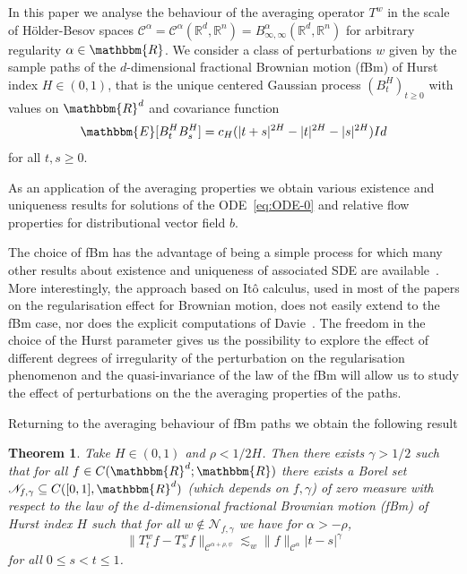 \documentclass[a4paper,11pt]{article}
\newtheorem{theorem}{Theorem}[section]
\newcommand{\CC}{\mathscr C}
\newcommand{\CN}{\mathscr N}
\newcommand{\RR}{\mathbb R}
\begin{document}
In this paper we analyse the behaviour of the averaging operator $T^{w}$ in
the scale of Hölder-Besov spaces $\CC^{\alpha} = \CC^{\alpha} ( \RR^{d} ,
\RR^{n} ) =B^{\alpha}_{\infty , \infty} ( \RR^{d} , \RR^{n} )$ for arbitrary
regularity $\alpha \in \mathbbm{R}$. We consider a class of perturbations $w$
given by the sample paths of the $d$-dimensional fractional Brownian motion
(fBm) of Hurst index $H \in ( 0,1 )$, that is the unique centered Gaussian
process $( B^{H}_{t} )_{t \geqslant 0}$ with values on $\mathbbm{R}^{d}$ and
covariance function
\[ \mathbbm{E} [ B^{H}_{t} B_{s}^{H} ] =c_{H} ( | t+s |^{2H} - | t |^{2H} - |
   s |^{2H} )Id \]
for all $t,s \geqslant 0$.

As an application of the averaging properties we obtain various existence and
uniqueness results for solutions of the ODE~{\eqref{eq:ODE-0}} and relative
flow properties for distributional vector field $b$.



The choice of fBm has the advantage of being a simple process for which many
other results about existence and uniqueness of associated SDE are
available~{\cite{MR1934157}}. More interestingly, the approach based on Itô
calculus, used in most of the papers on the regularisation effect for Brownian
motion, does not easily extend to the fBm case, nor does the explicit computations
of Davie~{\cite{MR2377011}}. The freedom in the choice of the Hurst parameter
gives us the possibility to explore the effect of different degrees of
irregularity of the perturbation on the regularisation phenomenon and the
quasi-invariance of the law of the fBm will allow us to study the effect of
perturbations on the the averaging properties of the paths.



Returning to the averaging behaviour of fBm paths we obtain the following
result

\begin{theorem}
  \label{th:regularization-fbm}Take $H \in ( 0,1 )$ and $\rho <1/2H$. Then
  there exists $\gamma >1/2$ such that for all $f \in C ( \mathbbm{R}^{d}
  ;\mathbbm{R} )$ there exists a Borel set $\CN_{f, \gamma} \subseteq
  C ( [ 0,1 ] ,\mathbbm{R}^{d} )$ (which depends on $f, \gamma$) of zero
  measure with respect to the law of the $d$-dimensional fractional Brownian
  motion (fBm) of Hurst index $H$ such that for all $w \notin
  \CN_{f, \gamma}$ we have for $\alpha>-\rho$,
  \[ \| T^{w}_{t} f-T^{w}_{s} f \|_{\CC^{\alpha + \rho , \psi}} \lesssim_{w}
     \| f \|_{\CC^{\alpha}} | t-s |^{\gamma} \]
  for all $0 \leqslant s<t \leqslant 1$.
\end{theorem}
\end{document}
